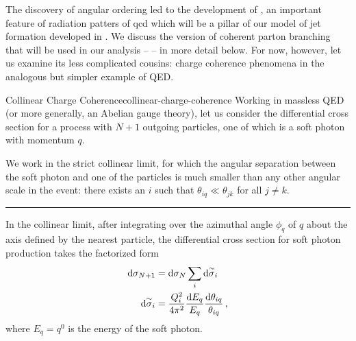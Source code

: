 The discovery of angular ordering led to the development of  \cite{Dokshitzer:1982fh,Webber:1983if,Marchesini:1983bm,Ciafaloni:1984zr,Catani:1985ta,Catani:1989yc,Ellis:1996mzs,Collins:2011zzd}, an important feature of radiation patters of \gls{qcd} which will be a pillar of our model of jet formation developed in .
%
We discuss the version of coherent parton branching that will be used in our analysis --  -- in more detail below.
%
For now, however, let us examine its less complicated cousins:
%
charge coherence phenomena in the analogous but simpler example of QED.

\begin{lemma}{Collinear Charge Coherence}{collinear-charge-coherence}
    Working in massless QED (or more generally, an Abelian gauge theory), let us consider the differential cross section for a process with \(N+1\) outgoing particles, one of which is a soft photon with momentum \(q\).

    We work in the strict collinear limit, for which the angular separation between the soft photon and one of the particles is much smaller than any other angular scale in the event:
    there exists an \(i\) such that \(\theta_{iq} \ll \theta_{jk}\) for all \(j \neq k\).

    \vspace{7pt}
    \hrule
    \vspace{7pt}

    In the collinear limit, after integrating over the azimuthal angle \(\phi_{q}\) of \(q\) about the axis defined by the nearest particle, the differential cross section for soft photon production takes the factorized form
    \begin{align}
        \label{eq:soft-photon-factorization}
        \dd \sigma_{N+1}
        &=
        \dd\sigma_N
        \sum_i\dsigmatilde_i
        \\
        \label{eq:soft-photon-splitting-probability}
        \dsigmatilde_i
        &=
        \frac{Q_i^2}{4\pi^2}
        \frac{\dd E_q}{E_q}
        \frac{\dd\theta_{iq}}{\theta_{iq}}
        \,,
    \end{align}
    where \(E_q = q^0\) is the energy of the soft photon.
\end{lemma}


